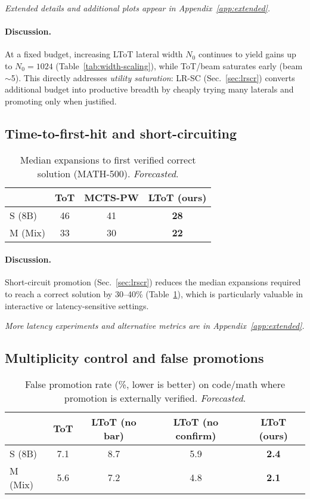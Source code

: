 \documentclass{article}
\begin{document}
\noindent\textit{Extended details and additional plots appear in Appendix~\ref{app:extended}.}
\paragraph{Discussion.}
At a fixed budget, increasing LToT lateral width $N_0$ continues to yield gains up to $N_0{=}1024$ (Table~\ref{tab:width-scaling}), while ToT/beam saturates early (beam $\sim$5).
This directly addresses \emph{utility saturation}: LR-SC (Sec.~\ref{sec:lrscr}) converts additional budget into productive breadth by cheaply trying many laterals and promoting only when justified.

\subsection{Time-to-first-hit and short-circuiting}
\label{subsec:ttfh}

\begin{table}[t]
\centering
\caption{Median expansions to first verified correct solution (MATH-500). \emph{Forecasted}.}
\vspace{0.3em}
\begin{tabular}{lccc}
\toprule
 & \textbf{ToT} & \textbf{MCTS-PW} & \textbf{LToT (ours)} \\
\midrule
S (8B)  & 46  & 41  & \textbf{28} \\
M (Mix) & 33  & 30  & \textbf{22} \\
\bottomrule
\end{tabular}
\label{tab:ttfh}
\end{table}

\paragraph{Discussion.}
Short-circuit promotion (Sec.~\ref{sec:lrscr}) reduces the median expansions required to reach a correct solution by 30--40\% (Table~\ref{tab:ttfh}), which is particularly valuable in interactive or latency-sensitive settings.

\noindent\textit{More latency experiments and alternative metrics are in Appendix~\ref{app:extended}.}
\subsection{Multiplicity control and false promotions}
\label{subsec:false-promotions}

\begin{table}[t]
\centering
\caption{False promotion rate (\%, lower is better) on code/math where promotion is externally verified. \emph{Forecasted}.}
\vspace{0.3em}
\begin{tabular}{lcccc}
\toprule
 & \textbf{ToT} & \textbf{LToT (no bar)} & \textbf{LToT (no confirm)} & \textbf{LToT (ours)} \\
\midrule
S (8B)  & 7.1  & 8.7  & 5.9  & \textbf{2.4} \\
M (Mix) & 5.6  & 7.2  & 4.8  & \textbf{2.1} \\
\bottomrule
\end{tabular}
\label{tab:false-promotions}
\end{table}
\end{document}
